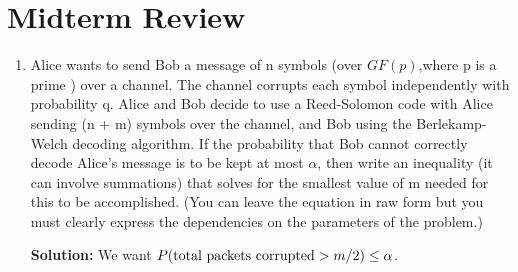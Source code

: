 \documentclass{article}
\newenvironment{solution}{

            \color{blue} \smallskip \textbf{Solution:}}{}
\begin{document}
    \section{Midterm Review}
    \begin{enumerate}
        \item Alice wants to send Bob a message of n symbols (over $GF(p)$,where p is a prime ) over a channel. The channel corrupts each symbol independently with probability q. Alice and Bob decide to use a Reed-Solomon code with Alice sending (n + m) symbols over the channel, and Bob using the Berlekamp-Welch decoding algorithm. If the probability that Bob cannot correctly decode Alice’s message is to be kept at most $\alpha$, then write an inequality (it can involve summations) that solves for the smallest value of m needed for this to be accomplished. (You can leave the equation in raw form but you must clearly express the dependencies on the parameters of the problem.)
        \begin{solution}
            We want $P(\textnormal{total packets corrupted} > m/2) \leq \alpha$.
            

\end{solution}
\end{enumerate}
\end{document}
